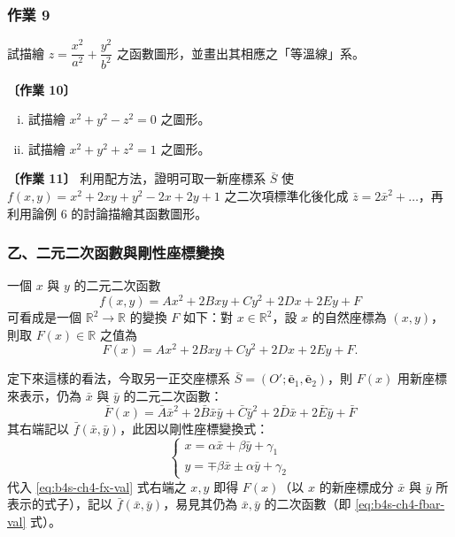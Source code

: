 \subsubsection*{作業 9}
試描繪 $z = \dfrac{x^2}{a^2} + \dfrac{y^2}{b^2}$ 之函數圖形，並畫出其相應之「等溫線」系。

\textbf{〔作業 10〕}
\begin{enumerate}[(i)]
  \item 試描繪 $x^2 + y^2 - z^2 = 0$ 之圖形。
  \item 試描繪 $x^2 + y^2 + z^2 = 1$ 之圖形。
\end{enumerate}

\textbf{〔作業 11〕} 利用配方法，證明可取一新座標系 $\bar{S}$ 使 $f(x, y) = x^2 + 2xy + y^2 - 2x + 2y + 1$ 之二次項標準化後化成 $\bar{z} = 2\bar{x}^2 + \dots$，再利用論例 6 的討論描繪其函數圖形。

\subsubsection*{乙、\quad 二元二次函數與剛性座標變換}

一個 $x$ 與 $y$ 的二元二次函數
\begin{equation}
f(x, y) = Ax^2 + 2Bxy + Cy^2 + 2Dx + 2Ey + F
\label{eq:b4s-ch4-func-fxy}
\end{equation}
可看成是一個 $\mathbb{R}^2 \to \mathbb{R}$ 的變換 $F$ 如下：對 $x \in \mathbb{R}^2$，設 $x$ 的自然座標為 $(x, y)$，則取 $F(x) \in \mathbb{R}$ 之值為
\begin{equation}
F(x) = Ax^2 + 2Bxy + Cy^2 + 2Dx + 2Ey + F.
\label{eq:b4s-ch4-fx-val}
\end{equation}

定下來這樣的看法，今取另一正交座標系 $\bar{S} = (O'; \bar{\mathbf{e}}_1, \bar{\mathbf{e}}_2)$，則 $F(x)$ 用新座標來表示，仍為 $\bar{x}$ 與 $\bar{y}$ 的二元二次函數：
\begin{equation}
\bar{F}(x) = \bar{A}\bar{x}^2 + 2\bar{B}\bar{x}\bar{y} + \bar{C}\bar{y}^2 + 2\bar{D}\bar{x} + 2\bar{E}\bar{y} + \bar{F}
\label{eq:b4s-ch4-fbar-val}
\end{equation}
其右端記以 $\bar{f}(\bar{x}, \bar{y})$，此因以剛性座標變換式：
\begin{equation}
\begin{cases}
x = \alpha \bar{x} + \beta \bar{y} + \gamma_1 \\
y = \mp \beta \bar{x} \pm \alpha \bar{y} + \gamma_2
\end{cases}
\label{eq:b4s-ch4-rigid-coord-transform}
\end{equation}
代入 \eqref{eq:b4s-ch4-fx-val} 式右端之 $x, y$ 即得 $F(x)$（以 $x$ 的新座標成分 $\bar{x}$ 與 $\bar{y}$ 所表示的式子），記以 $\bar{f}(\bar{x}, \bar{y})$，易見其仍為 $\bar{x}, \bar{y}$ 的二次函數（即 \eqref{eq:b4s-ch4-fbar-val} 式）。


